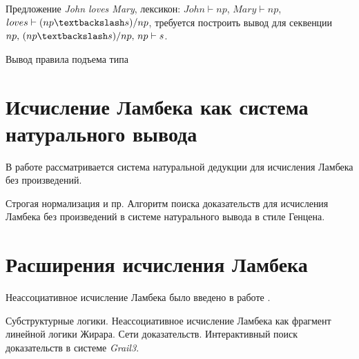 \begin{example} Предложение \textit{John loves Mary}, лексикон: $John \vdash np$, $Mary \vdash np$, $loves \vdash (np \textbackslash s)/np$, требуется построить вывод для секвенции $np, \, (np \textbackslash s)/np, \, np \vdash s$.

\begin{prooftree}
\end{prooftree}
\end{example}

\begin{example} Вывод правила подъема типа
\begin{prooftree}
\end{prooftree}
\end{example}

\section{Исчисление Ламбека как система натурального вывода}

В работе \parencite{konig1989parsing} рассматривается система натуральной дедукции для исчисления Ламбека без произведений.

Строгая нормализация и пр. Алгоритм поиска доказательств для исчисления Ламбека без произведений в системе натурального вывода в стиле Генцена.

\section{Расширения исчисления Ламбека}

Неассоциативное исчисление Ламбека было введено в работе \parencite{lambek1961calculus}.

Субструктурные логики. Неассоциативное исчисление Ламбека как фрагмент линейной логики Жирара. Сети доказательств. Интерактивный поиск доказательств в системе \textit{Grail3}.